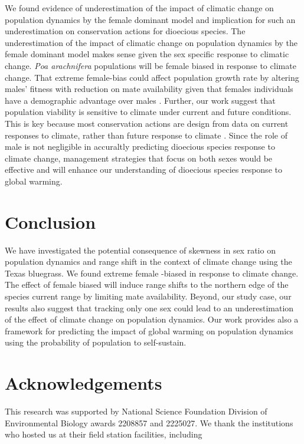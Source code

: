 \documentclass[12pt]{article}\usepackage[]{graphicx}\usepackage[dvipsnames]{xcolor}
\begin{document}
We found evidence of underestimation of the impact of climatic change on population dynamics by the female dominant model and implication for such an underestimation on conservation actions for dioecious species.
The underestimation of the impact of climatic change on population dynamics by the female dominant model makes sense given the sex specific response to climatic change. 
\emph{Poa arachnifera} populations will be female biased in response to climate change.
That extreme female-bias could affect population growth rate by altering males’ fitness with reduction on mate availability given that females individuals have a demographic advantage over males \citep{knight2005pollen,haridas2014frequency}.
Further, our work suggest that population viability is sensitive to climate under current  and future conditions.
This is key because most conservation actions are design from  data on current responses to climate, rather than future response to climate \citep{sletvold2013climate}.
Since the role of male is not negligible in accuraltly predicting dioecious species response to climate change, management strategies that focus on both sexes would be effective and will enhance our understanding of dioecious species response to global warming.

\section*{Conclusion}
We have investigated the potential consequence of skewness in sex ratio on population dynamics and range shift in the context of climate change using the Texas bluegrass. 
We found extreme female -biased in response to climate change. 
The effect of female biased will induce range shifts to the northern edge of the species current range by limiting mate availability.
Beyond, our study case, our results also suggest that tracking only one sex could lead to an underestimation of the effect of climate change on population dynamics. 
Our work  provides also a framework for predicting the impact of global warming on population dynamics using the probability of population to self-sustain. 

\section*{Acknowledgements}
This research was supported by National Science Foundation Division of Environmental Biology awards 2208857 and 2225027. 
We thank the institutions who hosted us at their field station facilities, including
\end{document}
